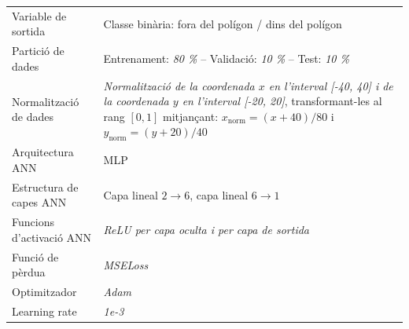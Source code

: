 \documentclass[a4paper,11pt, titlepage, twoside]{article}
\begin{document}
\begin{appendices}
\begin{table}[H]
\begin{tabular}{p{4.2cm} p{8.5cm}}
			Variable de sortida
			                   & Classe binària: fora del polígon / dins del polígon                                                                                                                 \\

			Partició de dades
			                   & Entrenament: \textit{80 \%} -- Validació: \textit{10 \%} -- Test: \textit{10 \%}                                                                                    \\

			Normalització de dades
			                   & \textit{Normalització de la coordenada $x$ en l'interval [-40, 40] i de la coordenada $y$ en l'interval [-20, 20]}, transformant-les al rang $[0,1]$ mitjançant:
			$x_{\text{norm}} = (x+40)/80$ i $y_{\text{norm}} = (y+20)/40$                                                                                                                            \\

			Arquitectura ANN
			                   & MLP                                                                                                                                                                 \\

			Estructura de capes ANN
			                   & Capa lineal $2 \rightarrow 6$, capa lineal $6 \rightarrow 1$                                                                                                        \\

			Funcions d'activació ANN
			                   & \textit{ReLU per capa oculta i per capa de sortida}                                                                                                                 \\

			Funció de pèrdua
			                   & \textit{MSELoss}                                                                                                                                                    \\

			Optimitzador
			                   & \textit{Adam}                                                                                                                                                       \\

			Learning rate
			                   & \textit{1e-3}                                                                                                                                                       \\


\end{tabular}
\end{table}
\end{appendices}
\end{document}
